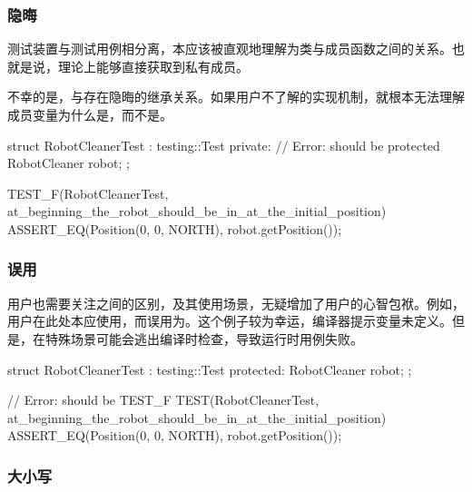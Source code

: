 \begin{content}
\subsubsection{隐晦}

测试装置与测试用例相分离，本应该被直观地理解为类与成员函数之间的关系。也就是说，理论上能够直接获取到私有成员。

不幸的是，与存在隐晦的继承关系。如果用户不了解的实现机制，就根本无法理解成员变量为什么是，而不是。

\begin{leftbar}
 \begin{c++}[caption={\ttfamily{错误：本应该使用protected，而错误地使用private}}]
struct RobotCleanerTest : testing::Test {
private:  // Error: should be protected
  RobotCleaner robot;
};
 
TEST_F(RobotCleanerTest, at_beginning_the_robot_should_be_in_at_the_initial_position) {
  ASSERT_EQ(Position(0, 0, NORTH), robot.getPosition());
}
  \end{c++}
\end{leftbar}

\subsubsection{误用}

用户也需要关注之间的区别，及其使用场景，无疑增加了用户的心智包袱。例如，用户在此处本应使用，而误用为。这个例子较为幸运，编译器提示变量未定义。但是，在特殊场景可能会逃出编译时检查，导致运行时用例失败。

\begin{leftbar}
 \begin{c++}[caption={\ttfamily{错误：本应该使用TEST\_F，而错误地使用TEST}}]
struct RobotCleanerTest : testing::Test {
protected:
  RobotCleaner robot;
};

// Error: should be TEST\_F
TEST(RobotCleanerTest, at_beginning_the_robot_should_be_in_at_the_initial_position) {
  ASSERT_EQ(Position(0, 0, NORTH), robot.getPosition());
}
  \end{c++}
\end{leftbar}

\subsubsection{大小写}


\end{content}
